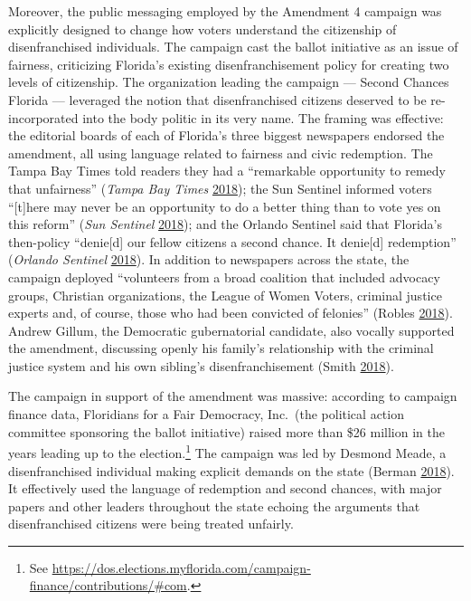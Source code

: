 \documentclass[
  12pt,
]{article}
\begin{document}
Moreover, the public messaging employed by the Amendment 4 campaign was explicitly designed to change how voters understand the citizenship of disenfranchised individuals. The campaign cast the ballot initiative as an issue of fairness, criticizing Florida's existing disenfranchisement policy for creating two levels of citizenship. The organization leading the campaign --- Second Chances Florida --- leveraged the notion that disenfranchised citizens deserved to be re-incorporated into the body politic in its very name. The framing was effective: the editorial boards of each of Florida's three biggest newspapers endorsed the amendment, all using language related to fairness and civic redemption. The Tampa Bay Times told readers they had a ``remarkable opportunity to remedy that unfairness'' (\emph{Tampa Bay Times} \protect\hyperlink{ref-tampabaytimes2018}{2018}); the Sun Sentinel informed voters ``{[}t{]}here may never be an opportunity to do a better thing than to vote yes on this reform'' (\emph{Sun Sentinel} \protect\hyperlink{ref-SunSentinelEditorial2018}{2018}); and the Orlando Sentinel said that Florida's then-policy ``denie{[}d{]} our fellow citizens a second chance. It denie{[}d{]} redemption'' (\emph{Orlando Sentinel} \protect\hyperlink{ref-ORLANDOSENTINEL2018}{2018}). In addition to newspapers across the state, the campaign deployed ``volunteers from a broad coalition that included advocacy groups, Christian organizations, the League of Women Voters, criminal justice experts and, of course, those who had been convicted of felonies'' (Robles \protect\hyperlink{ref-Robles2018}{2018}). Andrew Gillum, the Democratic gubernatorial candidate, also vocally supported the amendment, discussing openly his family's relationship with the criminal justice system and his own sibling's disenfranchisement (Smith \protect\hyperlink{ref-Smith2018}{2018}).

The campaign in support of the amendment was massive: according to campaign finance data, Floridians for a Fair Democracy, Inc.~(the political action committee sponsoring the ballot initiative) raised more than \$26 million in the years leading up to the election.\footnote{See \url{https://dos.elections.myflorida.com/campaign-finance/contributions/\#com}.} The campaign was led by Desmond Meade, a disenfranchised individual making explicit demands on the state (Berman \protect\hyperlink{ref-Berman2018}{2018}). It effectively used the language of redemption and second chances, with major papers and other leaders throughout the state echoing the arguments that disenfranchised citizens were being treated unfairly.
\end{document}
